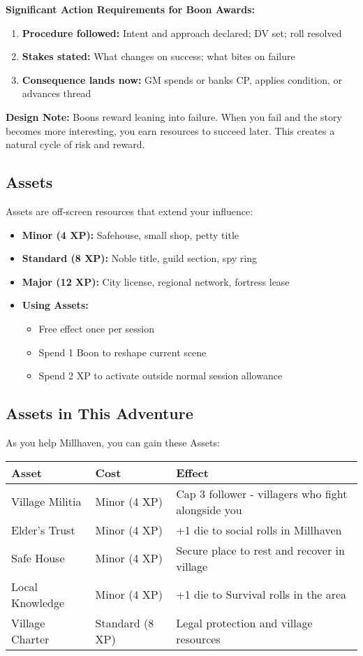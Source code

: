 \documentclass[11pt]{article}
\begin{document}
\textbf{Significant Action Requirements for Boon Awards:}
\begin{enumerate}
\item \textbf{Procedure followed:} Intent and approach declared; DV set; roll resolved
\item \textbf{Stakes stated:} What changes on success; what bites on failure
\item \textbf{Consequence lands now:} GM spends or banks CP, applies condition, or advances thread
\end{enumerate}

\textbf{Design Note:} Boons reward leaning into failure. When you fail and the story becomes more interesting, you earn resources to succeed later. This creates a natural cycle of risk and reward.

\subsection{Assets}

Assets are off-screen resources that extend your influence:
\begin{itemize}
\item \textbf{Minor (4 XP):} Safehouse, small shop, petty title
\item \textbf{Standard (8 XP):} Noble title, guild section, spy ring
\item \textbf{Major (12 XP):} City license, regional network, fortress lease
\item \textbf{Using Assets:}
   \begin{itemize}
   \item Free effect once per session
   \item Spend 1 Boon to reshape current scene
   \item Spend 2 XP to activate outside normal session allowance
   \end{itemize}
\end{itemize}

\subsection{Assets in This Adventure}

As you help Millhaven, you can gain these Assets:

\begin{center}
\begin{tabular}{|l|l|l|}
\hline
\textbf{Asset} & \textbf{Cost} & \textbf{Effect} \\
\hline
Village Militia & Minor (4 XP) & Cap 3 follower - villagers who fight alongside you \\
Elder's Trust & Minor (4 XP) & +1 die to social rolls in Millhaven \\
Safe House & Minor (4 XP) & Secure place to rest and recover in village \\
Local Knowledge & Minor (4 XP) & +1 die to Survival rolls in the area \\
Village Charter & Standard (8 XP) & Legal protection and village resources \\
\hline
\end{tabular}
\end{center}
\end{document}
